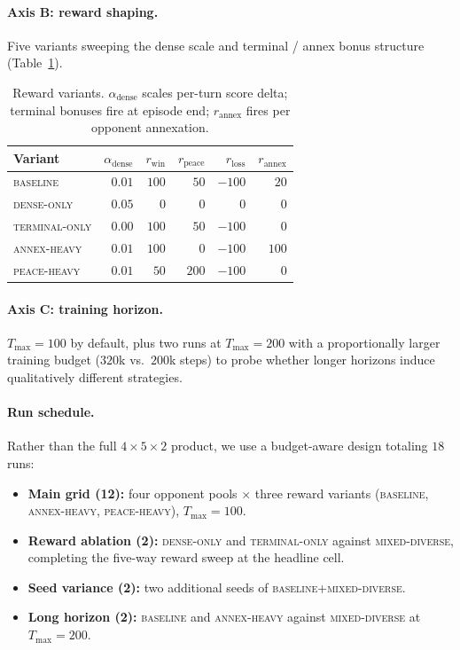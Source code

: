 \documentclass[11pt, a4paper, onecolumn]{article} %
\begin{document}
\paragraph{Axis B: reward shaping.}
Five variants sweeping the dense scale and terminal / annex bonus structure
(Table~\ref{tab:rewards}).

\begin{table}[h]
\centering
\small
\begin{tabular}{lrrrrr}
\toprule
Variant & $\alpha_{\text{dense}}$ & $r_{\text{win}}$ & $r_{\text{peace}}$ &
$r_{\text{loss}}$ & $r_{\text{annex}}$ \\
\midrule
\textsc{baseline}      & $0.01$ & $100$ & $50$  & $-100$ & $20$  \\
\textsc{dense-only}    & $0.05$ & $0$   & $0$   & $0$    & $0$   \\
\textsc{terminal-only} & $0.00$ & $100$ & $50$  & $-100$ & $0$   \\
\textsc{annex-heavy}   & $0.01$ & $100$ & $0$   & $-100$ & $100$ \\
\textsc{peace-heavy}   & $0.01$ & $50$  & $200$ & $-100$ & $0$   \\
\bottomrule
\end{tabular}
\caption{Reward variants. $\alpha_{\text{dense}}$ scales per-turn score delta;
terminal bonuses fire at episode end; $r_{\text{annex}}$ fires per opponent
annexation.}
\label{tab:rewards}
\end{table}

\paragraph{Axis C: training horizon.}
$T_{\max}{=}100$ by default, plus two runs at $T_{\max}{=}200$ with a
proportionally larger training budget ($320$k vs.\ $200$k steps) to probe
whether longer horizons induce qualitatively different strategies.

\paragraph{Run schedule.}
Rather than the full $4{\times}5{\times}2$ product, we use a budget-aware
design totaling $18$ runs:

\begin{itemize}
    \item \textbf{Main grid (12):} four opponent pools $\times$ three reward
          variants (\textsc{baseline}, \textsc{annex-heavy}, \textsc{peace-heavy}),
          $T_{\max}{=}100$.
    \item \textbf{Reward ablation (2):} \textsc{dense-only} and
          \textsc{terminal-only} against \textsc{mixed-diverse}, completing
          the five-way reward sweep at the headline cell.
    \item \textbf{Seed variance (2):} two additional seeds of
          \textsc{baseline}+\textsc{mixed-diverse}.
    \item \textbf{Long horizon (2):} \textsc{baseline} and \textsc{annex-heavy}
          against \textsc{mixed-diverse} at $T_{\max}{=}200$.
\end{itemize}
\end{document}
